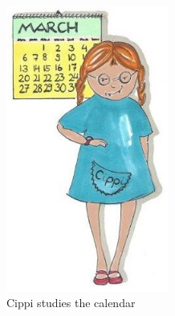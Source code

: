 \begin{center}
\includegraphics[width=0.4\textwidth]{content/3/chapter5/images/18.png}\\
Cippi studies the calendar
\end{center}
